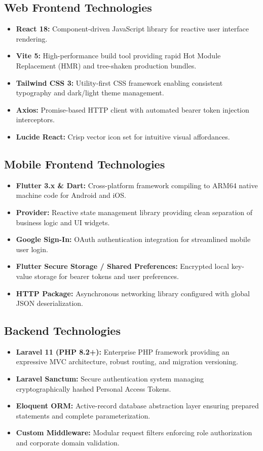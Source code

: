 \subsection{Web Frontend Technologies}
\begin{itemize}
    \item \textbf{React 18:} Component-driven JavaScript library for reactive user interface rendering.
    \item \textbf{Vite 5:} High-performance build tool providing rapid Hot Module Replacement (HMR) and tree-shaken production bundles.
    \item \textbf{Tailwind CSS 3:} Utility-first CSS framework enabling consistent typography and dark/light theme management.
    \item \textbf{Axios:} Promise-based HTTP client with automated bearer token injection interceptors.
    \item \textbf{Lucide React:} Crisp vector icon set for intuitive visual affordances.
\end{itemize}

\subsection{Mobile Frontend Technologies}
\begin{itemize}
    \item \textbf{Flutter 3.x \& Dart:} Cross-platform framework compiling to ARM64 native machine code for Android and iOS.
    \item \textbf{Provider:} Reactive state management library providing clean separation of business logic and UI widgets.
    \item \textbf{Google Sign-In:} OAuth authentication integration for streamlined mobile user login.
    \item \textbf{Flutter Secure Storage / Shared Preferences:} Encrypted local key-value storage for bearer tokens and user preferences.
    \item \textbf{HTTP Package:} Asynchronous networking library configured with global JSON deserialization.
\end{itemize}

\subsection{Backend Technologies}
\begin{itemize}
    \item \textbf{Laravel 11 (PHP 8.2+):} Enterprise PHP framework providing an expressive MVC architecture, robust routing, and migration versioning.
    \item \textbf{Laravel Sanctum:} Secure authentication system managing cryptographically hashed Personal Access Tokens.
    \item \textbf{Eloquent ORM:} Active-record database abstraction layer ensuring prepared statements and complete parameterization.
    \item \textbf{Custom Middleware:} Modular request filters enforcing role authorization and corporate domain validation.
\end{itemize}

